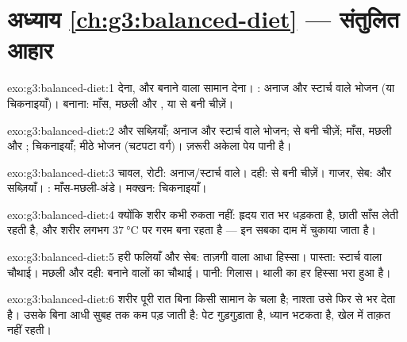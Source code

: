\section*{अध्याय \ref{ch:g3:balanced-diet} --- संतुलित आहार}

\begin{solution}{exo:g3:balanced-diet:1}
 देना, और बनाने वाला सामान देना। : अनाज और स्टार्च वाले भोजन
(या चिकनाइयाँ)। बनाना: माँस, मछली और , या  से बनी चीज़ें।
\end{solution}

\begin{solution}{exo:g3:balanced-diet:2}
 और सब्ज़ियाँ; अनाज और स्टार्च वाले भोजन;  से बनी चीज़ें; माँस,
मछली और ; चिकनाइयाँ; मीठे भोजन (चटपटा वर्ग)। ज़रूरी अकेला पेय पानी
है।
\end{solution}

\begin{solution}{exo:g3:balanced-diet:3}
चावल, रोटी: अनाज/स्टार्च वाले। दही:  से बनी चीज़ें। गाजर, सेब: 
और सब्ज़ियाँ। : माँस-मछली-अंडे। मक्खन: चिकनाइयाँ।
\end{solution}

\begin{solution}{exo:g3:balanced-diet:4}
क्योंकि शरीर कभी रुकता नहीं: हृदय रात भर धड़कता है, छाती साँस लेती
रहती है, और शरीर लगभग $\qty{37}{\degreeCelsius}$ पर गरम बना रहता है
--- इन सबका दाम  में चुकाया जाता है।
\end{solution}

\begin{solution}{exo:g3:balanced-diet:5}
हरी फलियाँ और सेब: ताज़गी वाला आधा हिस्सा। पास्ता: स्टार्च वाला
चौथाई। मछली और दही: बनाने वालों का चौथाई। पानी: गिलास। थाली का हर
हिस्सा भरा हुआ है।
\end{solution}

\begin{solution}{exo:g3:balanced-diet:6}
शरीर पूरी रात बिना किसी सामान के चला है; नाश्ता उसे फिर से भर देता है।
उसके बिना आधी सुबह तक  कम पड़ जाती है: पेट गुड़गुड़ाता है, ध्यान
भटकता है, खेल में ताक़त नहीं रहती।
\end{solution}

